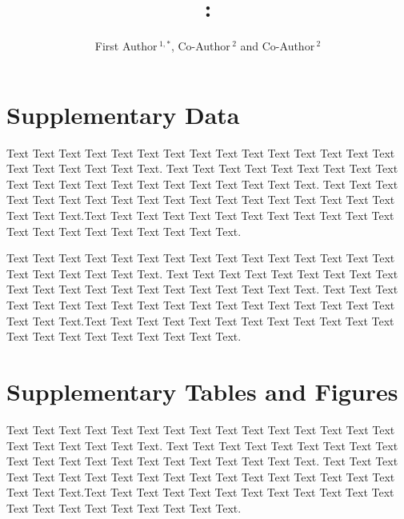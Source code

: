 \documentclass{frontiers_suppmat} %
\def\firstAuthorLast{Frontiers}
\def\Authors{First Author\,$^{1,*}$, Co-Author\,$^{2}$ and Co-Author\,$^2$}
\begin{document}
\onecolumn
{}

\title[Supplementary Material]{{}:\\ }
\author[\firstAuthorLast ]{\Authors}
\address{}
\correspondance{}
\extraAuth{}%
\topic{}%

\maketitle


\section{Supplementary Data}

%
Text Text Text Text Text Text  Text Text Text Text Text Text Text Text Text  Text Text Text Text Text Text. Text Text Text Text Text Text  Text Text Text Text Text Text Text Text Text  Text Text Text Text Text Text. Text Text Text Text Text Text  Text Text Text Text Text Text Text Text Text  Text Text Text Text Text Text.Text Text Text Text Text Text  Text Text Text Text Text Text Text Text Text  Text Text Text Text Text Text.

Text Text Text Text Text Text  Text Text Text Text Text Text Text Text Text  Text Text Text Text Text Text. Text Text Text Text Text Text  Text Text Text Text Text Text Text Text Text  Text Text Text Text Text Text. Text Text Text Text Text Text  Text Text Text Text Text Text Text Text Text  Text Text Text Text Text Text.Text Text Text Text Text Text  Text Text Text Text Text Text Text Text Text  Text Text Text Text Text Text.


\section{Supplementary Tables and Figures}

Text Text Text Text Text Text  Text Text Text Text Text Text Text Text Text  Text Text Text Text Text Text. Text Text Text Text Text Text  Text Text Text Text Text Text Text Text Text  Text Text Text Text Text Text. Text Text Text Text Text Text  Text Text Text Text Text Text Text Text Text  Text Text Text Text Text Text.Text Text Text Text Text Text  Text Text Text Text Text Text Text Text Text  Text Text Text Text Text Text.
\end{document}
